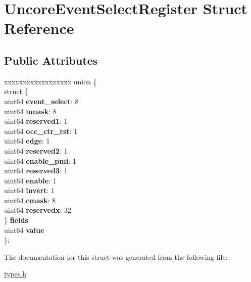 \hypertarget{struct_uncore_event_select_register}{}\section{Uncore\+Event\+Select\+Register Struct Reference}
\label{struct_uncore_event_select_register}
\subsection*{Public Attributes}
\begin{DoxyCompactItemize}
\item 
\mbox{\label{struct_uncore_event_select_register_a781df49c14f3b13df85e8cb9190a0394}} 
\begin{tabbing}
xx\=xx\=xx\=xx\=xx\=xx\=xx\=xx\=xx\=\kill
union \{\\
\>struct \{\\
\>\>uint64 {\bfseries event\_select}: 8\\
\>\>uint64 {\bfseries umask}: 8\\
\>\>uint64 {\bfseries reserved1}: 1\\
\>\>uint64 {\bfseries occ\_ctr\_rst}: 1\\
\>\>uint64 {\bfseries edge}: 1\\
\>\>uint64 {\bfseries reserved2}: 1\\
\>\>uint64 {\bfseries enable\_pmi}: 1\\
\>\>uint64 {\bfseries reserved3}: 1\\
\>\>uint64 {\bfseries enable}: 1\\
\>\>uint64 {\bfseries invert}: 1\\
\>\>uint64 {\bfseries cmask}: 8\\
\>\>uint64 {\bfseries reservedx}: 32\\
\>\} {\bfseries fields}\\
\>uint64 {\bfseries value}\\
\}; \\

\end{tabbing}\end{DoxyCompactItemize}


The documentation for this struct was generated from the following file\+:\begin{DoxyCompactItemize}
\item 
\mbox{\hyperlink{types_8h}{types.\+h}}\end{DoxyCompactItemize}
